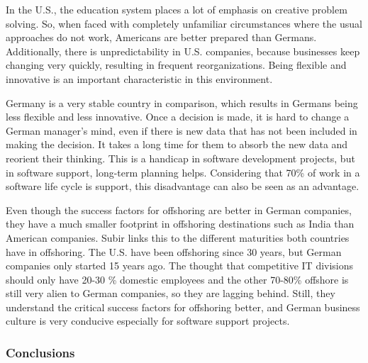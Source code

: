 In the U.S., the education system places a lot of emphasis on creative problem solving. So, when faced with completely unfamiliar circumstances where the usual approaches do not work, Americans are better prepared than Germans. Additionally, there is unpredictability in U.S. companies, because businesses keep changing very quickly, resulting in frequent reorganizations. Being flexible and innovative is an important characteristic in this environment.

Germany is a very stable country in comparison, which results in Germans being less flexible and less innovative. Once a decision is made, it is hard to change a German manager's mind, even if there is new data that has not been included in making the decision. It takes a long time for them to absorb the new data and reorient their thinking. This is a handicap in software development projects, but in software support, long-term planning helps. Considering that 70\% of work in a software life cycle is support, this disadvantage can also be seen as an advantage.

Even though the success factors for offshoring are better in German companies, they have a much smaller footprint in offshoring destinations such as India than American companies. Subir links this to the different maturities both countries have in offshoring. The U.S. have been offshoring since 30 years, but German companies only started 15 years ago. The thought that competitive IT divisions should only have 20-30 \% domestic employees and the other 70-80\% offshore is still very alien to German companies, so they are lagging behind. Still, they understand the critical success factors for offshoring better, and German business culture is very conducive especially for software support projects.

\subsubsection{Conclusions}


